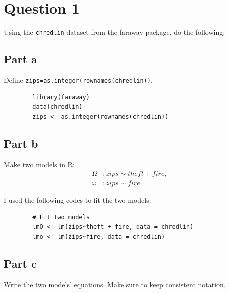 \section{Question 1}

\begin{question}
    Using the \verb+chredlin+ dataset from the faraway package, do the following:
\end{question}

\subsection{Part a}

\begin{question}
    Define \verb+zips=as.integer(rownames(chredlin))+.
\end{question}

\begin{answer}
    \begin{verbatim}
        library(faraway)
        data(chredlin)
        zips <- as.integer(rownames(chredlin))
    \end{verbatim}
\end{answer}

\subsection{Part b}

\begin{question}
    Make two models in R:
    \begin{align}
        \Omega &: zips \sim theft + fire,\\
        \omega &: zips \sim fire.
    \end{align}
    
\end{question}

\begin{answer}
    I used the following codes to fit the two models:
    \begin{verbatim}
        # Fit two models
        lmO <- lm(zips~theft + fire, data = chredlin)
        lmo <- lm(zips~fire, data = chredlin)
    \end{verbatim}
\end{answer}

\subsection{Part c}

\begin{question}
    Write the two models’ equations. Make sure to keep consistent notation.
\end{question}

